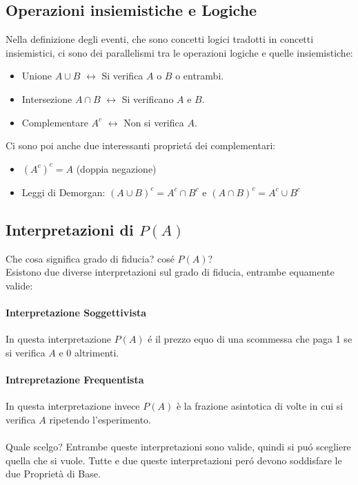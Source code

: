 \subsection*{Operazioni insiemistiche e Logiche}
Nella definizione degli eventi, che sono concetti logici tradotti in concetti insiemistici, ci sono dei parallelismi tra le operazioni logiche e quelle insiemistiche:
\begin{itemize}
    \item Unione $A\cup B$ $\longleftrightarrow$ Si verifica $A$ o $B$ o entrambi.
    \item Intersezione $A \cap B$ $\longleftrightarrow$ Si verificano $A$ e $B$.
    \item Complementare $A^c$ $\longleftrightarrow$ Non si verifica $A$.
\end{itemize}
Ci sono poi anche due interessanti proprietá dei complementari:
\begin{itemize}
    \item $(A^c)^c = A$ (doppia negazione)
    \item Leggi di Demorgan: $(A \cup B)^c = A^c \cap B^c$ e $(A \cap B)^c = A^c \cup B^c$
\end{itemize}

\subsection{Interpretazioni di $P(A)$}
Che cosa significa grado di fiducia? cosé $P(A)$?
\\Esistono due diverse interpretazioni sul grado di fiducia, entrambe equamente valide:
\paragraph{Interpretazione Soggettivista} In questa interpretazione $P(A)$ é il prezzo equo di una scommessa che paga 1 se si 
verifica $A$ e 0 altrimenti.
\paragraph{Intrepretazione Frequentista} In questa interpretazione invece $P(A)$ è la frazione asintotica di volte in cui si verifica $A$ ripetendo l'esperimento.

\paragraph*{}Quale scelgo? Entrambe queste interpretazioni sono valide, quindi si puó scegliere quella che si vuole.
Tutte e due queste interpretazioni peró devono soddisfare le due Proprietà di Base.

